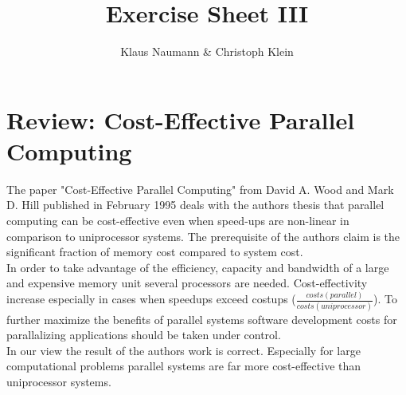 \documentclass[DIV=12,oneside,a4paper]{scrartcl}
\begin{document}

\title{Exercise Sheet III}
\subject{Advanced Parallel Computing}
\author{Klaus Naumann \& Christoph Klein}
\maketitle




\section{Review: Cost-Effective Parallel Computing}
The paper "Cost-Effective Parallel Computing" from David A. Wood and 
Mark D. Hill published in February 1995 deals with the authors thesis
that parallel computing can be cost-effective even when speed-ups are
non-linear in comparison to uniprocessor systems. The prerequisite of 
the authors claim is the significant fraction of memory cost compared
to system cost.
\\
In order to take advantage of the efficiency, capacity and bandwidth 
of a large and expensive memory unit several processors are needed.
Cost-effectivity increase especially in cases when speedups exceed 
costups ($\frac{costs(parallel)}{costs(uniprocessor)}$). To further
maximize the benefits of parallel systems software development costs
for parallalizing applications should be taken under control.
\\
In our view the result of the authors work is correct. Especially for
large computational problems parallel systems are far more cost-effective
than uniprocessor systems.
\end{document}
